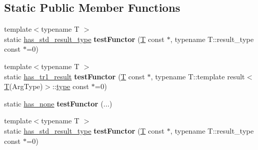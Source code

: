 \subsection*{Static Public Member Functions}
\begin{DoxyCompactItemize}
\item 
\mbox{\label{struct_eigen_1_1internal_1_1result__of_3_01_func_07_arg_type_08_4_adc8f0e3f81babf9ec363150457c5a88b}} 
{\footnotesize template$<$typename T $>$ }\\static \hyperlink{struct_eigen_1_1internal_1_1has__std__result__type}{has\+\_\+std\+\_\+result\+\_\+type} {\bfseries test\+Functor} (\hyperlink{group___sparse_core___module}{T} const $\ast$, typename T\+::result\+\_\+type const $\ast$=0)
\item 
\mbox{\label{struct_eigen_1_1internal_1_1result__of_3_01_func_07_arg_type_08_4_aedd18d6980d959a0a6889426c791fea3}} 
{\footnotesize template$<$typename T $>$ }\\static \hyperlink{struct_eigen_1_1internal_1_1has__tr1__result}{has\+\_\+tr1\+\_\+result} {\bfseries test\+Functor} (\hyperlink{group___sparse_core___module}{T} const $\ast$, typename T\+::template result$<$ \hyperlink{group___sparse_core___module}{T}(Arg\+Type)$>$\+::\hyperlink{group___sparse_core___module}{type} const $\ast$=0)
\item 
\mbox{\label{struct_eigen_1_1internal_1_1result__of_3_01_func_07_arg_type_08_4_af6e85180ec6bbd25744ccdcba7382e78}} 
static \hyperlink{struct_eigen_1_1internal_1_1has__none}{has\+\_\+none} {\bfseries test\+Functor} (...)
\item 
\mbox{\label{struct_eigen_1_1internal_1_1result__of_3_01_func_07_arg_type_08_4_adc8f0e3f81babf9ec363150457c5a88b}} 
{\footnotesize template$<$typename T $>$ }\\static \hyperlink{struct_eigen_1_1internal_1_1has__std__result__type}{has\+\_\+std\+\_\+result\+\_\+type} {\bfseries test\+Functor} (\hyperlink{group___sparse_core___module}{T} const $\ast$, typename T\+::result\+\_\+type const $\ast$=0)
\item 
\mbox{\label{struct_eigen_1_1internal_1_1result__of_3_01_func_07_arg_type_08_4_aedd18d6980d959a0a6889426c791fea3}} 

\end{DoxyCompactItemize}
